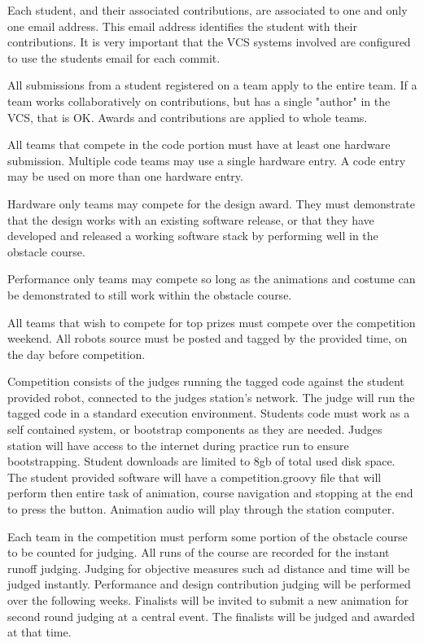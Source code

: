 \documentclass{article}
\begin{document}
Each student, and their associated contributions, are associated to one and only one email address. This email address identifies the student with their contributions. It is very important that the VCS systems involved are configured to use the students email for each commit. 

All submissions from a student registered on a team apply to the entire team. If a team works collaboratively on contributions, but has a single "author" in the VCS, that is OK. Awards and contributions are applied to whole teams. 

All teams that compete in the code portion must have at least one hardware submission. Multiple code teams may use a single hardware entry. A code entry may be used on more than one hardware entry. 

Hardware only teams may compete for the design award. They must demonstrate that the design works with an existing software release, or that they have developed and released a working software stack by performing well in the obstacle course. 

Performance only teams may compete so long as the animations and costume can be demonstrated to still work within the obstacle course. 

All teams that wish to compete for top prizes must compete over the competition weekend. All robots source must be posted and tagged by the provided time, on the day before competition. 

Competition consists of the judges running the tagged code against the student provided robot, connected to the judges station's network. The judge will run the tagged code in a standard execution environment. Students code must work as a self contained system, or bootstrap components as they are needed. Judges station will have access to the internet during practice run to ensure bootstrapping. Student downloads are limited to 8gb of total used disk space. The student provided software will have a competition.groovy file that will perform then entire task of animation, course navigation and stopping at the end to press the button. Animation audio will play through the station computer. 

Each team in the competition must perform some portion of the obstacle course to be counted for judging. All runs of the course are recorded for the instant runoff judging. Judging for objective measures such ad distance and time will be judged instantly. Performance and design contribution judging will be performed over the following weeks. Finalists will be invited to submit a new animation for second round judging at a central event. The finalists will be judged and awarded at that time. 
\end{document}
